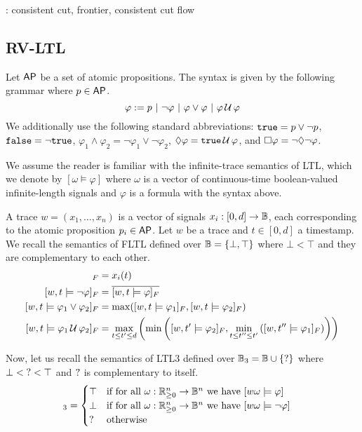 \begin{example}
	\TODO: consistent cut, frontier, consistent cut flow
\end{example}

\subsection{RV-LTL} \label{sec:rvltl}

Let $\mathsf{AP}$ be a set of atomic propositions.
The syntax is given by the following grammar where $p \in \mathsf{AP}$.
$$ \varphi :=  p ~|~ \lnot \varphi ~|~ \varphi \lor \varphi ~|~ \varphi \,\mathcal{U}\, \varphi $$
We additionally use the following standard abbreviations: $\texttt{true} = p \lor \lnot p$, $\texttt{false} = \lnot \texttt{true}$, $ \varphi_1 \land \varphi_2 = \lnot \varphi_1 \lor \lnot \varphi_2$, $\lozenge \varphi = \texttt{true} \,\mathcal{U}\, \varphi$, and $\square \varphi = \lnot \lozenge \lnot \varphi$.


We assume the reader is familiar with the infinite-trace semantics of LTL, which we denote by $[\omega \models \varphi]$ where $\omega$ is a vector of continuous-time boolean-valued infinite-length signals and $\varphi$ is a formula with the syntax above.

A trace $w = (x_1, \ldots, x_n)$ is a vector of signals $x_i : [0,d] \to \mathbb{B}$, each corresponding to the atomic proposition $p_i \in \mathsf{AP}$.
Let $w$ be a trace and $t \in [0,d]$ a timestamp.
We recall the semantics of FLTL defined over $\mathbb{B} = \{\bot, \top\}$ where $\bot < \top$ and they are complementary to each other. 
\begin{align*}
	[w,t \models p_i]_F &= x_i(t)\\
	[w,t \models \lnot \varphi]_F &= \overline{[w,t \models \varphi]_F}\\
	[w,t \models \varphi_1 \lor \varphi_2]_F &= \max([w,t \models \varphi_1]_F, [w,t \models \varphi_2]_F)\\
	[w,t \models \varphi_1 \until \varphi_2]_F &= \max_{t \leq t' \leq d} \left( \min \left( [w,t' \models \varphi_2]_F, \min_{t \leq t'' \leq t'} \left( [w,t'' \models \varphi_1]_F \right) \right) \right)\\
\end{align*}

Now, let us recall the semantics of LTL3 defined over $\mathbb{B}_3 = \mathbb{B} \cup \{\text{?}\}$ where $\bot < \text{?} < \top$ and $\text{?}$ is complementary to itself. %
\begin{align*}
	[w,t \models \varphi]_3 &= \begin{cases}
		\top &\text{if for all } \omega : \R_{\geq 0}^n \to \B^n \text{ we have } [w \omega \models \varphi]\\
		\bot &\text{if for all } \omega : \R_{\geq 0}^n \to \B^n \text{ we have } [w \omega \models \lnot \varphi]\\
		\? &\text{otherwise}\\
	\end{cases}
\end{align*}

